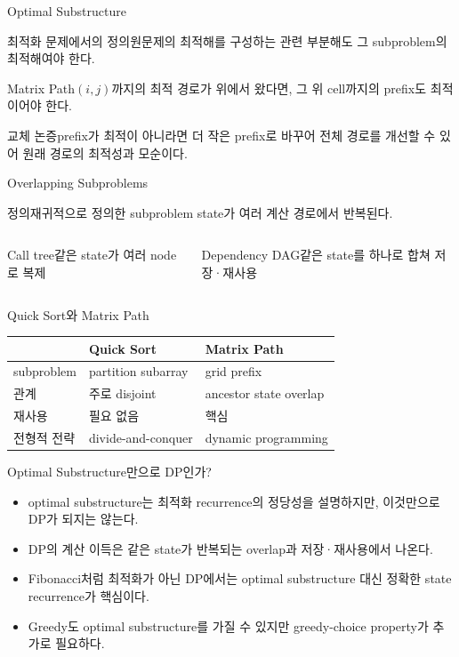 \begin{frame}{Optimal Substructure}
\begin{block}{최적화 문제에서의 정의}원문제의 최적해를 구성하는 관련 부분해도 그 subproblem의 최적해여야 한다.\end{block}
\begin{exampleblock}{Matrix Path}$(i,j)$까지의 최적 경로가 위에서 왔다면, 그 위 cell까지의 prefix도 최적이어야 한다.\end{exampleblock}
\begin{alertblock}{교체 논증}prefix가 최적이 아니라면 더 작은 prefix로 바꾸어 전체 경로를 개선할 수 있어 원래 경로의 최적성과 모순이다.\end{alertblock}
\end{frame}
\begin{frame}{Overlapping Subproblems}
\begin{block}{정의}재귀적으로 정의한 subproblem state가 여러 계산 경로에서 반복된다.\end{block}
\begin{columns}[T]\begin{block}{Call tree}같은 state가 여러 node로 복제\end{block}
\begin{block}{Dependency DAG}같은 state를 하나로 합쳐 저장·재사용\end{block}\end{columns}
\end{frame}
\begin{frame}{Quick Sort와 Matrix Path}
\small\centering\begin{tabular}{lll}\toprule
&Quick Sort&Matrix Path\\\midrule
subproblem&partition subarray&grid prefix\\
관계&주로 disjoint&ancestor state overlap\\
재사용&필요 없음&핵심\\
전형적 전략&divide-and-conquer&dynamic programming\\\bottomrule
\end{tabular}
\end{frame}
\begin{frame}{Optimal Substructure만으로 DP인가?}
\begin{itemize}
\item optimal substructure는 최적화 recurrence의 정당성을 설명하지만, 이것만으로 DP가 되지는 않는다.
\item DP의 계산 이득은 같은 state가 반복되는 overlap과 저장·재사용에서 나온다.
\item Fibonacci처럼 최적화가 아닌 DP에서는 optimal substructure 대신 정확한 state recurrence가 핵심이다.
\item Greedy도 optimal substructure를 가질 수 있지만 greedy-choice property가 추가로 필요하다.
\end{itemize}
\end{frame}
